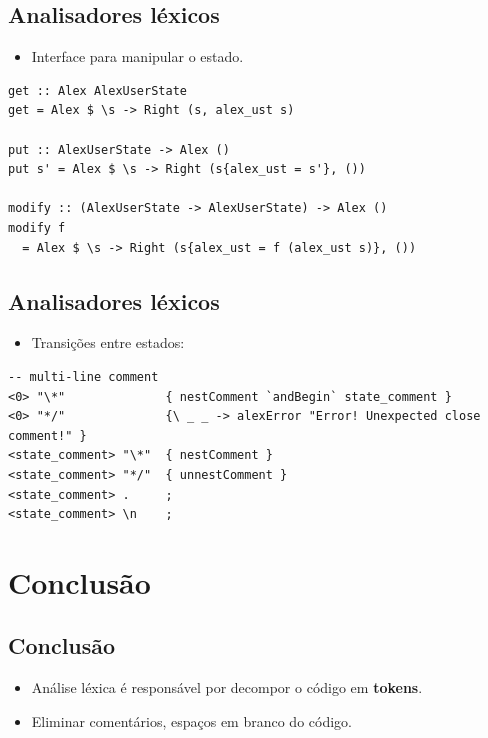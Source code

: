 \documentclass[11pt]{article}
\begin{document}
\subsection*{Analisadores léxicos}
\label{sec:org477620e}

\begin{itemize}
\item Interface para manipular o estado.
\end{itemize}

\begin{verbatim}
get :: Alex AlexUserState
get = Alex $ \s -> Right (s, alex_ust s)

put :: AlexUserState -> Alex ()
put s' = Alex $ \s -> Right (s{alex_ust = s'}, ())

modify :: (AlexUserState -> AlexUserState) -> Alex ()
modify f
  = Alex $ \s -> Right (s{alex_ust = f (alex_ust s)}, ())
\end{verbatim}
\subsection*{Analisadores léxicos}
\label{sec:org4b0a1da}

\begin{itemize}
\item Transições entre estados:
\end{itemize}

\begin{verbatim}
-- multi-line comment
<0> "\*"              { nestComment `andBegin` state_comment }
<0> "*/"              {\ _ _ -> alexError "Error! Unexpected close comment!" }
<state_comment> "\*"  { nestComment }
<state_comment> "*/"  { unnestComment }
<state_comment> .     ;
<state_comment> \n    ;
\end{verbatim}
\section*{Conclusão}
\label{sec:org2849c5b}

\subsection*{Conclusão}
\label{sec:orgbbbcc0a}

\begin{itemize}
\item Análise léxica é responsável por decompor o código em \textbf{\textbf{tokens}}.
\item Eliminar comentários, espaços em branco do código.
\end{itemize}
\end{document}
